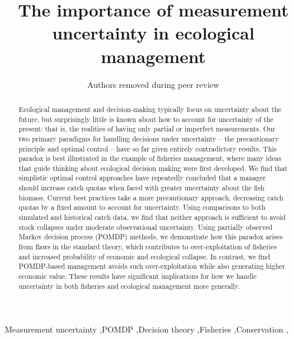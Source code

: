 \documentclass[3p]{elsarticle} %
\begin{document}
\begin{frontmatter}

  \title{The importance of measurement uncertainty in ecological management}
    \author[]{Authors removed during peer review}
  
  
    
  \begin{abstract}
  Ecological management and decision-making typically focus on uncertainty
  about the future, but surprisingly little is known about how to account
  for uncertainty of the present: that is, the realities of having only
  partial or imperfect measurements. Our two primary paradigms for
  handling decisions under uncertainty -- the precautionary principle and
  optimal control -- have so far given entirely contradictory results.
  This paradox is best illustrated in the example of fisheries management,
  where many ideas that guide thinking about ecological decision making
  were first developed. We find that simplistic optimal control approaches
  have repeatedly concluded that a manager should increase catch quotas
  when faced with greater uncertainty about the fish biomass. Current best
  practices take a more precautionary approach, decreasing catch quotas by
  a fixed amount to account for uncertainty. Using comparisons to both
  simulated and historical catch data, we find that neither approach is
  sufficient to avoid stock collapses under moderate observational
  uncertainty. Using partially observed Markov decision process (POMDP)
  methods, we demonstrate how this paradox arises from flaws in the
  standard theory, which contributes to over-exploitation of fisheries and
  increased probability of economic and ecological collapse. In contrast,
  we find POMDP-based management avoids such over-exploitation while also
  generating higher economic value. These results have significant
  implications for how we handle uncertainty in both fisheries and
  ecological management more generally.
  \end{abstract}
   \begin{keyword} Measurement uncertainty \sep POMDP \sep Decision theory \sep Fisheries \sep Conservation \sep \end{keyword}
 \end{frontmatter}
\end{document}
